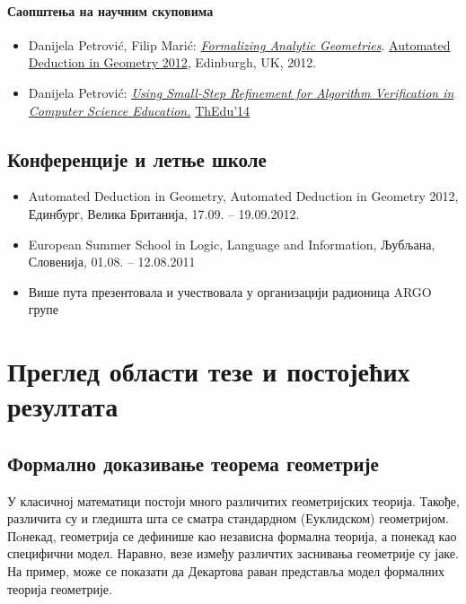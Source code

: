 \documentclass[11pt]{article}
\newcommand{\lat}{}
\begin{document}
\paragraph{Саопштења на научним скуповима}
\begin{itemize}
\item {\lat Danijela Petrović, Filip Marić:
    \href{http://poincare.matf.bg.ac.rs/~danijela/publications/ADG2012.pdf}{{\em Formalizing
      Analytic Geometries}}.
    \href{http://dream.inf.ed.ac.uk/events/adg2012/}{Automated
      Deduction in Geometry 2012}}, Edinburgh, UK, 2012.
\item {\lat Danijela Petrović:
    \href{http://poincare.matf.bg.ac.rs/~danijela/publications/text.pdf}{{\em Using
      Small-Step Refinement for Algorithm Verification in Computer
      Science Education.}}
    \href{http://www.uc.pt/en/congressos/thedu/thedu14}{ThEdu'14}}
\end{itemize}

\subsection{Конференције и летње школе}
\begin{itemize}
\item {\lat Automated Deduction in Geometry, Automated Deduction in
    Geometry} 2012, Единбург, Велика Британија, 17.09. -- 19.09.2012.
\item {\lat European Summer School in Logic, Language and
    Information}, Љубљана, Словенија, 01.08. -- 12.08.2011
\item Више пута презентовала и учествовала у организацији радионица
  ARGO групе
\end{itemize}

\section{Преглед области тезе и постојећих резултата}

\subsection{Формално доказивање теорема геометрије}

У класичној математици постоји много различитих геометријских теорија. Такође,
разли\-чи\-та су и гледишта шта се сматра стандардном (Еуклидском)
геометријом. Пoнекад, геоме\-три\-ја се дефинише као независна формална
теорија, а понекад као специфични модел. Наравно, везе између
различтих заснивања геометрије су јаке. На пример, може се показати да
Дека\-рто\-ва раван представља модел формалних теорија геометрије.
\end{document}

